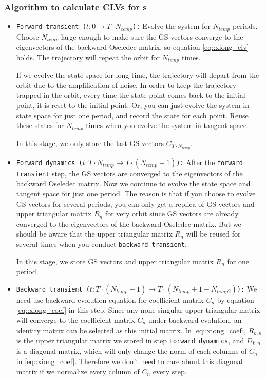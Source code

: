 \subsubsection{Algorithm to calculate CLVs for \po s}

    \begin{itemize}
     \item \texttt{Forward transient ($ t:0\to T \cdot N_{temp}$):}
     Evolve the system for $N_{temp}$ periods. Choose $N_{temp}$ large enough to make
     sure the GS vectors converge to the eigenvectors of
     the backward Oseledec matrix, so equation
     \eqref{eq::xiong_clv} holds. The trajectory will repeat the orbit for $N_{temp}$
     times.

     If we evolve the state space for long time, the trajectory will depart from the
     orbit due to the amplification of noise.
     In order to keep the trajectory trapped in the orbit, every time the state point
     comes back to the initial point, it is reset to the initial point. Or, you can
     just evolve the system in state space for just one period, and record the state
     for each point. Reuse these states for $N_{temp}$ times when you evolve the system
     in tangent space.

     In this stage, we only store the last GS vectors $G_{T \cdot N_{temp}}$.

     \item \texttt{Forward dynamics ($t:T \cdot N_{temp}\to T \cdot (N_{temp}+1)$):}
     After the \texttt{forward transient} step, the GS vectors are converged to the
     eigenvectors of the
     backward Oseledec matrix. Now we continue to evolve the state space and tangent
     space for just one period. The reason is that if you choose to evolve GS vectors
     for several periods,
     you can only get a replica of GS vectors and upper triangular matrix $R_{n}$ for
     very orbit since GS vectors are already converged to the eigenvectors of the
     backward Oseledec matrix. But we should be aware that the upper triangular matrix
     $R_{n}$ will be reused for several times when you conduct \texttt{backward transient}.

     In this stage, we store GS vectors and upper triangular matrix
     $R_{n}$ for one period.

      \item \texttt{Backward transient ($t:T \cdot (N_{temp}+1)\to T \cdot (N_{temp}+1-N_{temp2})$):}
      We need use backward evolution equation for coefficient matrix $C_{n}$ by equation
      \eqref{eq::xiong_coef} in this step.  Since any none-singular upper
      triangular matrix will converge to the coefficient matrix $C_n$ under
      backward evolution, an identity matrix can be selected as this initial
      matrix. In \eqref{eq::xiong_coef}, $R_{k,n}$ is the upper triangular
      matrix we stored in step \texttt{Forward dynamics}, and $D_{k,n}$ is a diagonal
      matrix, which will only change the norm of each columns of $C_{n}$ in
      \eqref{eq::xiong_coef}. Therefore we don't need to care about this diagonal matrix
      if we normalize every column of $C_{n}$ every step.


\end{itemize}
